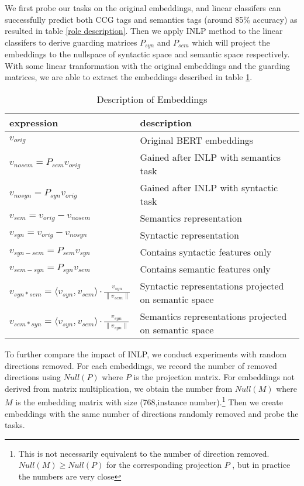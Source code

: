 \documentclass[11pt,a4paper]{article}
\begin{document}
We first probe our tasks on the original embeddings, and linear classifers can successfully predict both CCG tags and semantics tags (around 85\% accuracy) as resulted in table \ref{role description}. Then we apply INLP method to the linear classifers to derive guarding matrices $P_{syn}$ and $P_{sem}$ which will project the embeddings to the nullspace of syntactic space and semantic space respectively. With some linear tranformation with the original embeddings and the guarding matrices, we are able to extract the embeddings described in table \ref{description}. 
\begin{table}[ht]
    \centering
    \begin{tabular}{p{4cm}p{3cm}}
        expression & description\\ \hline 
        $v_{orig}$ & Original BERT embeddings  \\
        $v_{nosem} = P_{sem} v_{orig}$ & Gained after INLP with semantics task \\
        $v_{nosyn}= P_{syn} v_{orig}$ & Gained after INLP with syntactic task \\
        $v_{sem} = v_{orig}-v_{nosem}$ & Semantics representation \\
        $v_{syn} = v_{orig}-v_{nosyn}$ & Syntactic representation \\
        $v_{syn-sem} = P_{sem} v_{syn}$ &Contains syntactic features only \\
        $v_{sem-syn} = P_{syn} v_{sem}$ &Contains semantic features only \\
        $v_{syn*sem} = \langle v_{syn}, v_{sem} \rangle \cdot \frac{v_{syn}}{\|v_{sem}\|}$ & Syntactic representations projected on semantic space\\
        $v_{sem*syn} = \langle v_{syn}, v_{sem} \rangle \cdot \frac{v_{syn}}{\|v_{syn}\|}$ & Semantics representations projected on semantic space\\

        
        
        \hline
    \end{tabular}
    \caption{\label{description} Description of Embeddings
    }
\end{table}

To further compare the impact of INLP, we conduct experiments with random directions removed. For each embeddings, we record the number of removed directions using $Null(P)$ where $P$ is the projection matrix. For embeddings not derived from matrix multiplication, we obtain the number from $Null(M)$ where $M$ is the embedding matrix with size (768,instance number).\footnote{This is not necessarily equivalent to the number of direction removed. $Null(M) \geq Null(P)$ for the corresponding projection $P$ , but in practice the numbers are very close} Then we create embeddings with the same number of directions randomly removed and probe the tasks. 
\end{document}
